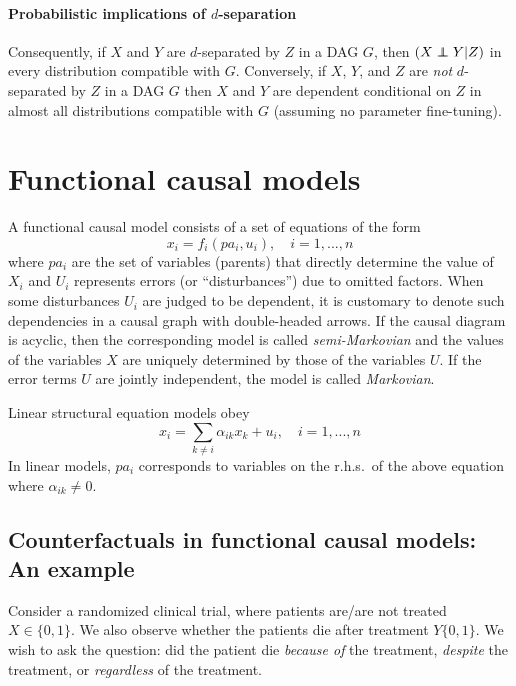 \documentclass[11pt]{article}
\numberwithin{equation}{section}
\newcommand\indep{\protect\mathpalette{\protect\independenT}{\perp}}
\def\independenT#1#2{\mathrel{\rlap{$#1#2$}\mkern2mu{#1#2}}}
\begin{document}
\paragraph{Probabilistic implications of $d$-separation} 
Consequently, if $X$ and $Y$ are $d$-separated by $Z$ in a DAG $G$, then $(X \indep Y | Z)$ in every distribution compatible with $G$. Conversely, if $X$, $Y$, and $Z$ are \textit{not} $d$-separated by $Z$ in a DAG $G$ then $X$ and $Y$ are dependent conditional on $Z$ in almost all distributions compatible with $G$ (assuming no parameter fine-tuning).

\section{Functional causal models}
A functional causal model consists of a set of equations of the form
\begin{equation}
x_i = f_i(pa_i, u_i), \quad i=1,...,n \label{eq:func-caus-mod}
\end{equation}
where $pa_i$ are the set of variables (parents) that directly determine the value of $X_i$ and $U_i$ represents errors (or ``disturbances'') due to omitted factors. When some disturbances $U_i$ are judged to be dependent, it is customary to denote such dependencies in a causal graph with double-headed arrows. If the causal diagram is acyclic, then the corresponding model is called \textit{semi-Markovian} and the values of the variables $X$ are uniquely determined by those of the variables $U$. If the error terms $U$ are jointly independent, the model is called \textit{Markovian}.

Linear structural equation models obey
\begin{equation}
x_i = \sum_{k \neq i} \alpha_{ik} x_k + u_i, \quad i=1,...,n 
\end{equation}
In linear models, $pa_i$ corresponds to variables on the r.h.s.\ of the above equation where $\alpha_{ik} \neq 0$.

\subsection{Counterfactuals in functional causal models: An example}
Consider a randomized clinical trial, where patients are/are not treated $X \in \{0,1\}$. We also observe whether the patients die after treatment $Y\{0,1\}$. We wish to ask the question: did the patient die \textit{because of} the treatment, \textit{despite} the treatment, or \textit{regardless} of the treatment.
\end{document}
